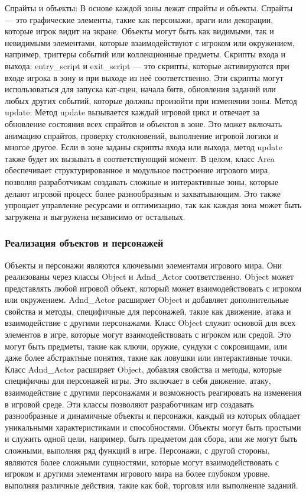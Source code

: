 Спрайты и объекты: В основе каждой зоны лежат спрайты и объекты. Спрайты — это графические элементы, такие как персонажи, враги или декорации, которые игрок видит на экране. Объекты могут быть как видимыми, так и невидимыми элементами, которые взаимодействуют с игроком или окружением, например, триггеры событий или коллекционные предметы.
Скрипты входа и выхода: entry\_script и exit\_script — это скрипты, которые активируются при входе игрока в зону и при выходе из неё соответственно. Эти скрипты могут использоваться для запуска кат-сцен, начала битв, обновления заданий или любых других событий, которые должны произойти при изменении зоны.
Метод update: Метод update вызывается каждый игровой цикл и отвечает за обновление состояния всех спрайтов и объектов в зоне. Это может включать анимацию спрайтов, проверку столкновений, выполнение игровой логики и многое другое. Если в зоне заданы скрипты входа или выхода, метод update также будет их вызывать в соответствующий момент.
В целом, класс Area обеспечивает структурированное и модульное построение игрового мира, позволяя разработчикам создавать сложные и интерактивные зоны, которые делают игровой процесс более разнообразным и захватывающим. Это также упрощает управление ресурсами и оптимизацию, так как каждая зона может быть загружена и выгружена независимо от остальных.
\subsubsection{Реализация объектов и персонажей}
Объекты и персонажи являются ключевыми элементами игрового мира. Они реализованы через классы Object и Adnd\_Actor соответственно. Object может представлять любой игровой объект, который может взаимодействовать с игроком или окружением. Adnd\_Actor расширяет Object и добавляет дополнительные свойства и методы, специфичные для персонажей, такие как движение, атака и взаимодействие с другими персонажами.
Класс Object служит основой для всех элементов в игре, которые могут взаимодействовать с игроком или средой. Это могут быть предметы, такие как ключи, оружие, сундуки с сокровищами, или даже более абстрактные понятия, такие как ловушки или интерактивные точки.
Класс Adnd\_Actor расширяет Object, добавляя свойства и методы, которые специфичны для персонажей игры. Это включает в себя движение, атаку, взаимодействие с другими персонажами и возможность реагировать на изменения в игровой среде.
Эти классы позволяют разработчикам игр создавать разнообразные и динамичные объекты и персонажи, каждый из которых обладает уникальными характеристиками и способностями. Объекты могут быть простыми и служить одной цели, например, быть предметом для сбора, или же могут быть сложными, выполняя ряд функций в игре. Персонажи, с другой стороны, являются более сложными сущностями, которые могут взаимодействовать с игроком и другими элементами игрового мира на более глубоком уровне, выполняя различные действия, такие как бой, торговля или выполнение заданий.
